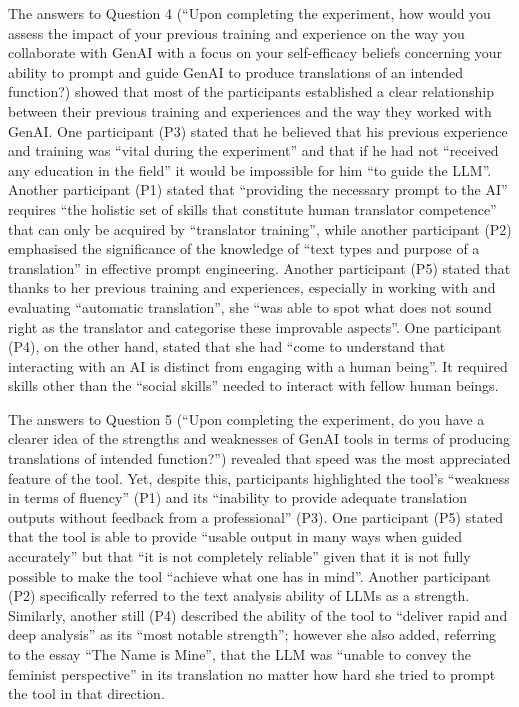 \documentclass[output=paper,colorlinks,citecolor=brown]{langscibook}
\begin{document}
The answers to Question 4 (“Upon completing the experiment, how would you assess the impact of your previous training and experience on the way you collaborate with GenAI with a focus on your self-efficacy beliefs concerning your ability to prompt and guide GenAI to produce translations of an intended function?) showed that most of the participants established a clear relationship between their previous training and experiences and the way they worked with GenAI. One participant (P3) stated that he believed that his previous experience and training was “vital during the experiment” and that if he had not “received any education in the field” it would be impossible for him “to guide the LLM”.  Another participant (P1) stated that “providing the necessary prompt to the AI” requires “the holistic set of skills that constitute human translator competence” that can only be acquired by “translator training”, while another participant (P2) emphasised the significance of the knowledge of “text types and purpose of a translation” in effective prompt engineering. Another participant (P5) stated that thanks to her previous training and experiences, especially in working with and evaluating “automatic translation”, she “was able to spot what does not sound right as the translator and categorise these improvable aspects”. One participant (P4), on the other hand, stated that she had “come to understand that interacting with an AI is distinct from engaging with a human being”. It required skills other than the “social skills” needed to interact with fellow human beings.

The answers to Question 5 (“Upon completing the experiment, do you have a clearer idea of the strengths and weaknesses of GenAI tools in terms of producing translations of intended function?”) revealed that speed was the most appreciated feature of the tool. Yet, despite this, participants highlighted the tool’s “weakness in terms of fluency” (P1) and its “inability to provide adequate translation outputs without feedback from a professional” (P3). One participant (P5) stated that the tool is able to provide “usable output in many ways when guided accurately” but that “it is not completely reliable” given that it is not fully possible to make the tool “achieve what one has in mind”. Another participant (P2) specifically referred to the text analysis ability of LLMs as a strength. Similarly, another still (P4) described the ability of the tool to “deliver rapid and deep analysis” as its “most notable strength”; however she also added, referring to the essay “The Name is Mine”, that the LLM was “unable to convey the feminist perspective” in its translation no matter how hard she tried to prompt the tool in that direction.
\end{document}
